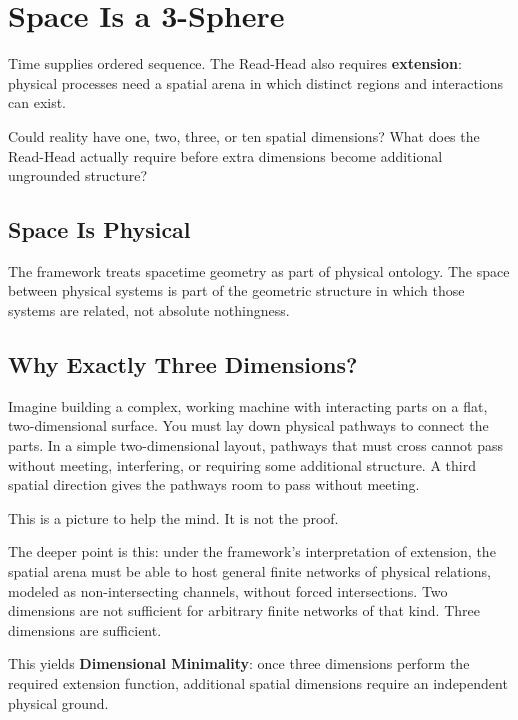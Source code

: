 \documentclass[11pt]{article}
\theoremstyle{canonstyle}
\begin{document}
\newpage
\section{Space Is a 3-Sphere}

Time supplies ordered sequence. The Read-Head also requires \textbf{extension}: physical processes need a spatial arena in which distinct regions and interactions can exist.

\begin{reflect}
Could reality have one, two, three, or ten spatial dimensions? What does the Read-Head actually require before extra dimensions become additional ungrounded structure?
\end{reflect}

\subsection{Space Is Physical}

The framework treats spacetime geometry as part of physical ontology. The space between physical systems is part of the geometric structure in which those systems are related, not absolute nothingness.

\subsection{Why Exactly Three Dimensions?}

Imagine building a complex, working machine with interacting parts on a flat, two-dimensional surface. You must lay down physical pathways to connect the parts. In a simple two-dimensional layout, pathways that must cross cannot pass without meeting, interfering, or requiring some additional structure. A third spatial direction gives the pathways room to pass without meeting.

This is a picture to help the mind. It is not the proof.

The deeper point is this: under the framework's interpretation of extension, the spatial arena must be able to host general finite networks of physical relations, modeled as non-intersecting channels, without forced intersections. Two dimensions are not sufficient for arbitrary finite networks of that kind. Three dimensions are sufficient.

This yields \textbf{Dimensional Minimality}: once three dimensions perform the required extension function, additional spatial dimensions require an independent physical ground.
\end{document}
